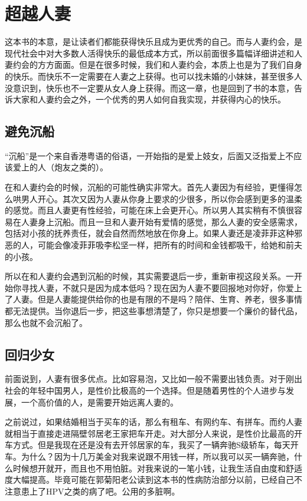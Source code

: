 \chapter{超越人妻}

这本书的本意，是让读者们都能获得快乐且成为更优秀的自己。而与人妻约会，是现代社会中对大多数人活得快乐的最低成本方式，所以前面很多篇幅详细讲述和人妻约会的方方面面。但是在很多时候，我们和人妻约会，本质上也是为了我们自身的快乐。而快乐不一定需要在人妻之上获得。也可以找未婚的小妹妹，甚至很多人没意识到，快乐也不一定要从女人身上获得。而这一章，也是回到了书的本意，告诉大家和人妻约会之外，一个优秀的男人如何自我实现，并获得内心的快乐。

\section{避免沉船}

``沉船''是一个来自香港粤语的俗语，一开始指的是爱上妓女，后面又泛指爱上不应该爱上的人（炮友之类的）。

在和人妻约会的时候，沉船的可能性确实非常大。首先人妻因为有经验，更懂得怎么哄男人开心。其次又因为人妻从你身上要求的少很多，所以你会感到更多的温柔的感觉。而且人妻更有性经验，可能在床上会更开心。所以男人其实稍有不慎很容易在人妻身上沉船。而且一旦和人妻开始有爱情的感觉，那么人妻的安全感需求，包括对小孩的抚养责任，就会自然而然地放在你身上。如果人妻还是凌菲菲这种邪恶的人，可能会像凌菲菲吸李松坚一样，把所有的时间和金钱都吸干，给她和前夫的小孩。

所以在和人妻约会遇到沉船的时候，其实需要退后一步，重新审视这段关系。一开始你寻找人妻，不就只是因为成本低吗？现在因为人妻不要回报地对你好，你爱上了人妻。但是人妻能提供给你的也是有限的不是吗？陪伴、生育、养老，很多事情都无法提供。当你退后一步，把这些事想清楚了，你只是想要一个廉价的替代品，那么也就不会沉船了。

\section{回归少女}

前面说到，人妻有很多优点。比如容易泡，又比如一般不需要出钱负责。对于刚出社会的年轻中国男人，是性价比极高的一个选择。但是随着男性的个人进步与发展，一个高价值的人，是需要开始远离人妻的。

之前说过，如果结婚相当于买车的话，那么有租车、有网约车、有拼车。而约人妻就相当于直接走进隔壁邻居老王家把车开走。对大部分人来说，是性价比最高的开车方式。但是我现在还是没有去开邻居家的车，我买了一辆奔驰S级轿车，每天开车。为什么？因为十几万美金对我来说跟不用钱一样，所以我可以买一辆奔驰，什么时候想开就开，而且也不用怕脏。对我来说的一笔小钱，让我生活自由度和舒适度大幅提高。毕竟可能在郭菊阳老公读到这本书的性病防治部分以前，已经自己不注意患上了HPV之类的病了吧。公用的多脏啊。

